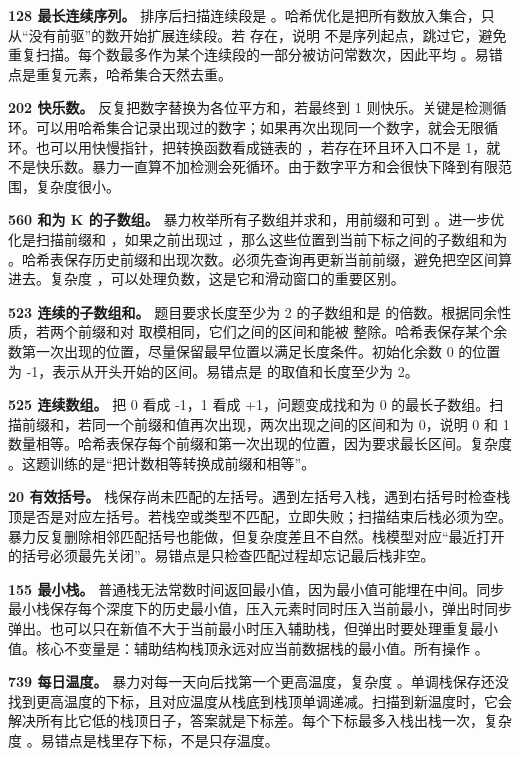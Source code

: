 \textbf{128 最长连续序列。} 排序后扫描连续段是 。哈希优化是把所有数放入集合，只从“没有前驱”的数开始扩展连续段。若  存在，说明  不是序列起点，跳过它，避免重复扫描。每个数最多作为某个连续段的一部分被访问常数次，因此平均 。易错点是重复元素，哈希集合天然去重。

\textbf{202 快乐数。} 反复把数字替换为各位平方和，若最终到 1 则快乐。关键是检测循环。可以用哈希集合记录出现过的数字；如果再次出现同一个数字，就会无限循环。也可以用快慢指针，把转换函数看成链表的 ，若存在环且环入口不是 1，就不是快乐数。暴力一直算不加检测会死循环。由于数字平方和会很快下降到有限范围，复杂度很小。

\textbf{560 和为 K 的子数组。} 暴力枚举所有子数组并求和，用前缀和可到 。进一步优化是扫描前缀和 ，如果之前出现过 ，那么这些位置到当前下标之间的子数组和为 。哈希表保存历史前缀和出现次数。必须先查询再更新当前前缀，避免把空区间算进去。复杂度 ，可以处理负数，这是它和滑动窗口的重要区别。

\textbf{523 连续的子数组和。} 题目要求长度至少为 2 的子数组和是  的倍数。根据同余性质，若两个前缀和对  取模相同，它们之间的区间和能被  整除。哈希表保存某个余数第一次出现的位置，尽量保留最早位置以满足长度条件。初始化余数 0 的位置为 -1，表示从开头开始的区间。易错点是  的取值和长度至少为 2。

\textbf{525 连续数组。} 把 0 看成 -1，1 看成 +1，问题变成找和为 0 的最长子数组。扫描前缀和，若同一个前缀和值再次出现，两次出现之间的区间和为 0，说明 0 和 1 数量相等。哈希表保存每个前缀和第一次出现的位置，因为要求最长区间。复杂度 。这题训练的是“把计数相等转换成前缀和相等”。

\textbf{20 有效括号。} 栈保存尚未匹配的左括号。遇到左括号入栈，遇到右括号时检查栈顶是否是对应左括号。若栈空或类型不匹配，立即失败；扫描结束后栈必须为空。暴力反复删除相邻匹配括号也能做，但复杂度差且不自然。栈模型对应“最近打开的括号必须最先关闭”。易错点是只检查匹配过程却忘记最后栈非空。

\textbf{155 最小栈。} 普通栈无法常数时间返回最小值，因为最小值可能埋在中间。同步最小栈保存每个深度下的历史最小值，压入元素时同时压入当前最小，弹出时同步弹出。也可以只在新值不大于当前最小时压入辅助栈，但弹出时要处理重复最小值。核心不变量是：辅助结构栈顶永远对应当前数据栈的最小值。所有操作 。

\textbf{739 每日温度。} 暴力对每一天向后找第一个更高温度，复杂度 。单调栈保存还没找到更高温度的下标，且对应温度从栈底到栈顶单调递减。扫描到新温度时，它会解决所有比它低的栈顶日子，答案就是下标差。每个下标最多入栈出栈一次，复杂度 。易错点是栈里存下标，不是只存温度。

